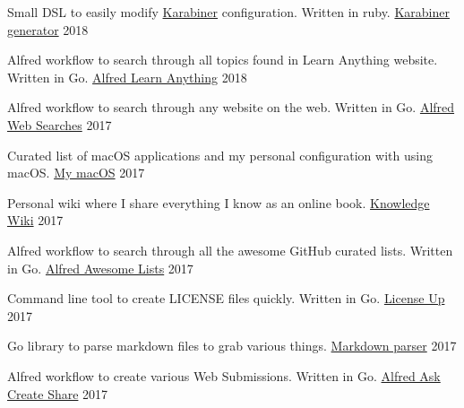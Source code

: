 
\begin{cventries}

  \cventry
    {Small DSL to easily modify \href{https://github.com/tekezo/Karabiner-Elements}{Karabiner} configuration. Written in ruby.}
    {\href{https://github.com/nikitavoloboev/karabiner-generator\#readme}{Karabiner generator}}
    {}
    {2018}
    {
    }

  \cventry
    {Alfred workflow to search through all topics found in Learn Anything website. Written in Go.}
    {\href{https://github.com/nikitavoloboev/alfred-learn-anything\#readme}{Alfred Learn Anything}}
    {}
    {2018}
    {
    }

    \cventry
    {Alfred workflow to search through any website on the web. Written in Go.}
    {\href{https://github.com/nikitavoloboev/alfred-web-searches\#readme}{Alfred Web Searches}}
    {}
    {2017}
    {
    }

    \cventry
    {Curated list of macOS applications and my personal configuration with using macOS.}
    {\href{https://github.com/nikitavoloboev/my-mac-os\#readme}{My macOS}}
    {}
    {2017}
    {
    }

    \cventry
    {Personal wiki where I share everything I know as an online book.}
    {\href{https://wiki.nikitavoloboev.xyz\#readme}{Knowledge Wiki}}
    {}
    {2017}
    {
    }

    \cventry
    {Alfred workflow to search through all the awesome GitHub curated lists. Written in Go.}
    {\href{https://github.com/nikitavoloboev/alfred-awesome-lists\#readme}{Alfred Awesome Lists}}
    {}
    {2017}
    {
    }

    \cventry
    {Command line tool to create LICENSE files quickly. Written in Go.}
    {\href{https://github.com/nikitavoloboev/license-up\#readme}{License Up}}
    {}
    {2017}
    {
    }

    \cventry
    {Go library to parse markdown files to grab various things.}
    {\href{https://github.com/nikitavoloboev/markdown-parser\#readme}{Markdown parser}}
    {}
    {2017}
    {
    }

    \cventry
    {Alfred workflow to create various Web Submissions. Written in Go.}
    {\href{https://github.com/nikitavoloboev/alfred-ask-create-share\#readme}{Alfred Ask Create Share}}
    {}
    {2017}
    {
    }

\end{cventries}
